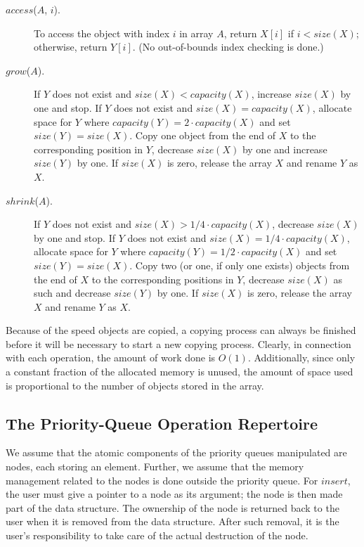 \documentclass{llncs}
\newcommand{\Insert}{\mbox{$\mathit{insert}$}}
\newcommand{\Access}{\mbox{$\mathit{access}$}}
\newcommand{\Grow}{\mbox{$\mathit{grow}$}}
\newcommand{\Shrink}{\mbox{$\mathit{shrink}$}}
\begin{document}
\begin{description}
\item[\Access{}($A$, $i$).] To access the object with index $i$ in
  array $A$, return $X[i]$ if $i < \mathit{size}(X)$;
  otherwise, return $Y[i]$. (No out-of-bounds index checking is done.)

\item[\Grow{}($A$).] 
  If $Y$ does not exist and $\mathit{size}(X) < \mathit{capacity}(X)$, 
  increase $\mathit{size}(X)$ by one and stop. 
  If $Y$ does not exist and $\mathit{size}(X) = \mathit{capacity}(X)$, allocate space 
  for $Y$ where $\mathit{capacity}(Y) = 2 \cdot \mathit{capacity}(X)$
  and set $\mathit{size}(Y) = \mathit{size}(X)$.   
  Copy one object from the end of $X$ to the corresponding position in $Y$, 
  decrease $\mathit{size}(X)$ by one and increase $\mathit{size}(Y)$ by one. 
  If $\mathit{size}(X)$ is zero, release the array $X$ and rename $Y$ as $X$.

\item[\Shrink{}($A$).] 
  If $Y$ does not exist and $\mathit{size}(X) > 1/4\cdot \mathit{capacity}(X)$, 
  decrease $\mathit{size}(X)$ by one and stop. 
  If $Y$ does not exist and $\mathit{size}(X) = 1/4\cdot \mathit{capacity}(X)$, 
  allocate space for $Y$ where $\mathit{capacity}(Y) = 1/2 \cdot\allowbreak{} \mathit{capacity}(X)$
  and set $\mathit{size}(Y) = \mathit{size}(X)$. 
  Copy two (or one, if only one exists) objects from the end of $X$ to the corresponding positions in $Y$,
  decrease $\mathit{size}(X)$ as such and decrease $\mathit{size}(Y)$ by one. 
  If $\mathit{size}(X)$ is zero, release the array $X$ and rename $Y$ as $X$.
\end{description}

Because of the speed objects are copied, a copying process can always
be finished before it will be necessary to start a new copying
process.  Clearly, in connection with each operation, the amount of
work done is $O(1)$. Additionally, since only a constant fraction of
the allocated memory is unused, the amount of space used is
proportional to the number of objects stored in the array.


\subsection{The Priority-Queue Operation Repertoire}

We assume that the atomic components of the priority queues manipulated are
nodes, each storing an element. Further, we assume that the memory
management related to the nodes is done outside the priority queue. For
\Insert{}, the user must give a pointer to a node as its argument; the
node is then made part of the data structure. The ownership of the
node is returned back to the user when it is removed from the data
structure. After such removal, it is the user's responsibility to take
care of the actual destruction of the node.
\end{document}
